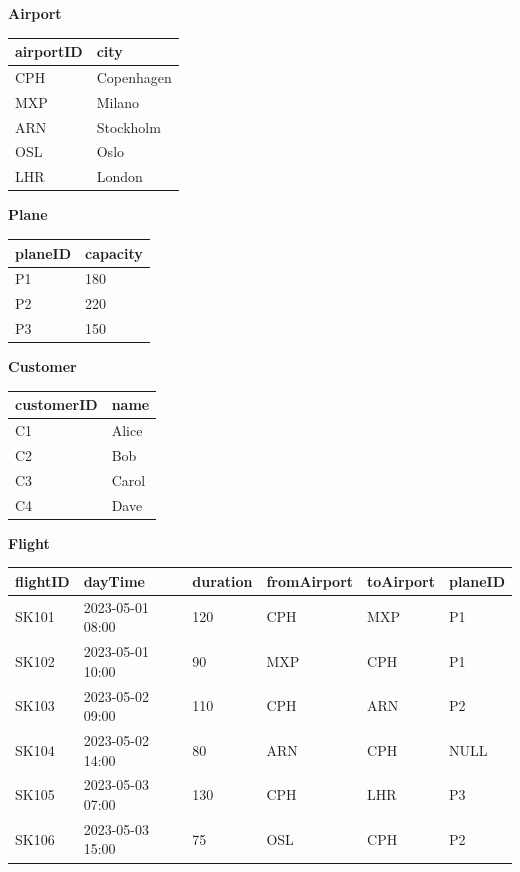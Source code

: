 \documentclass[12pt,a4paper]{article}
\begin{document}
\begin{minipage}[t]{0.3\textwidth}
\textbf{Airport}\\[0.3em]
\begin{tabular}{|l|l|}
\hline
\textbf{airportID} & \textbf{city} \\\hline
CPH & Copenhagen \\\hline
MXP & Milano \\\hline
ARN & Stockholm \\\hline
OSL & Oslo \\\hline
LHR & London \\\hline
\end{tabular}
\end{minipage}
\hfill
\begin{minipage}[t]{0.3\textwidth}
\textbf{Plane}\\[0.3em]
\begin{tabular}{|l|l|}
\hline
\textbf{planeID} & \textbf{capacity} \\\hline
P1 & 180 \\\hline
P2 & 220 \\\hline
P3 & 150 \\\hline
\end{tabular}
\end{minipage}
\hfill
\begin{minipage}[t]{0.3\textwidth}
\textbf{Customer}\\[0.3em]
\begin{tabular}{|l|l|}
\hline
\textbf{customerID} & \textbf{name} \\\hline
C1 & Alice \\\hline
C2 & Bob \\\hline
C3 & Carol \\\hline
C4 & Dave \\\hline
\end{tabular}
\end{minipage}

\vspace{1em}

\textbf{Flight}\\[0.3em]
\begin{tabular}{|l|l|l|l|l|l|}
\hline
\textbf{flightID} & \textbf{dayTime} & \textbf{duration} & \textbf{fromAirport} & \textbf{toAirport} & \textbf{planeID} \\\hline
SK101 & 2023-05-01 08:00 & 120 & CPH & MXP & P1 \\\hline
SK102 & 2023-05-01 10:00 & 90  & MXP & CPH & P1 \\\hline
SK103 & 2023-05-02 09:00 & 110 & CPH & ARN & P2 \\\hline
SK104 & 2023-05-02 14:00 & 80  & ARN & CPH & NULL \\\hline
SK105 & 2023-05-03 07:00 & 130 & CPH & LHR & P3 \\\hline
SK106 & 2023-05-03 15:00 & 75  & OSL & CPH & P2 \\\hline
\end{tabular}
\end{document}
